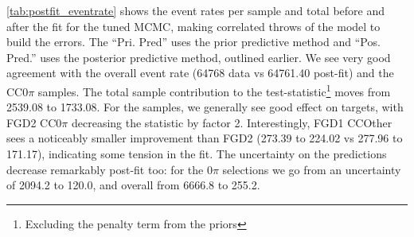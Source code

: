 \autoref{tab:postfit_eventrate} shows the event rates per sample and total before and after the fit for the tuned MCMC, making correlated throws of the model to build the errors. The ``Pri. Pred'' uses the prior predictive method and ``Pos. Pred.'' uses the posterior predictive method, outlined earlier. We see very good agreement with the overall event rate (64768 data vs 64761.40 post-fit) and the CC0$\pi$ samples. The total sample contribution to the test-statistic\footnote{Excluding the penalty term from the priors} moves from 2539.08 to 1733.08. For the samples, we generally see good effect on targets, with FGD2 CC0$\pi$ decreasing the statistic by factor 2. Interestingly, FGD1 CCOther sees a noticeably smaller improvement than FGD2 (273.39 to 224.02 vs 277.96 to 171.17), indicating some tension in the fit. The uncertainty on the predictions decrease remarkably post-fit too: for the 0$\pi$ selections we go from an uncertainty of 2094.2 to 120.0, and overall from 6666.8 to 255.2.
